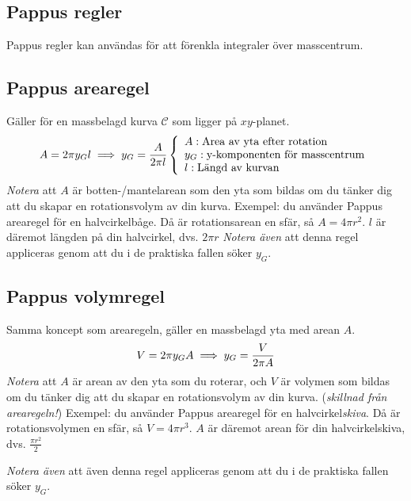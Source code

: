 \documentclass{article}
\newenvironment{ankiflashcard}[1]{}{}
\begin{document}
\begin{paracol}{2}
\section{Pappus regler}
Pappus regler kan användas för att förenkla integraler över masscentrum.

\begin{ankiflashcard}{Formulera Pappus arearegel.}
\subsection{Pappus arearegel}
Gäller för en massbelagd kurva $\mathcal C$ som ligger på $xy$-planet.
$$
A=2\pi y_G l\\ \implies y_G = \frac{A}{2\pi l}\left\{\begin{array}{l}A: \text{Area av yta efter rotation} \\y_G: \text{y-komponenten för masscentrum} \\l: \text{Längd av kurvan} \\\end{array}\right.
$$
\textit{Notera} att $A$ är botten-/mantelarean som den yta som bildas om du tänker dig att du skapar en rotationsvolym av din kurva.
Exempel: du använder Pappus arearegel för en halvcirkelbåge. Då är rotationsarean en sfär, så $A = 4\pi r^2$. $l$ är däremot längden på din halvcirkel, dvs. $2\pi r$
\textit{Notera även} att denna regel appliceras genom att du i de praktiska fallen söker $y_G$.
\end{ankiflashcard}

\begin{ankiflashcard}{Formulera Pappus volymregel.}
    \subsection{Pappus volymregel}
Samma koncept som arearegeln, gäller en massbelagd yta med arean $A$.
$$
V = 2\pi y_G A\\
\implies y_G = \frac{V}{2\pi A}
$$
\textit{Notera} att $A$ är arean av den yta som du roterar, och $V$ är volymen som bildas om du tänker dig att du skapar en rotationsvolym av din kurva.
(\textit{skillnad från arearegeln!})
Exempel: du använder Pappus arearegel för en halvcirkel\textit{skiva}. Då är rotationsvolymen en sfär, så $V = 4\pi r^3$. $A$ är däremot arean för din halvcirkelskiva, dvs. $\frac{\pi r^2}{2}$


\textit{Notera även} att även denna regel appliceras genom att du i de praktiska fallen söker $y_G$.
\end{ankiflashcard}


\end{paracol}
\end{document}
